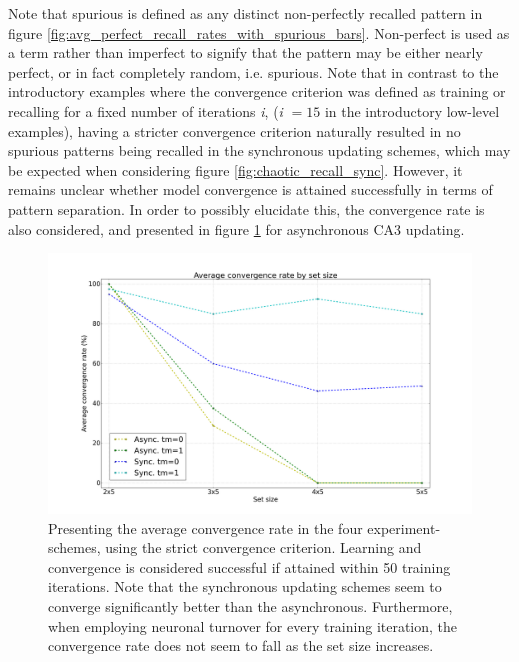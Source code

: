 Note that spurious is defined as any distinct non-perfectly recalled pattern in figure \ref{fig:avg_perfect_recall_rates_with_spurious_bars}. Non-perfect is used as a term rather than imperfect to signify that the pattern may be either nearly perfect, or in fact completely random, i.e. spurious. Note that in contrast to the introductory examples where the convergence criterion was defined as training or recalling for a fixed number of iterations \textit{i}, (\textit{i} $=15$ in the introductory low-level examples), having a stricter convergence criterion naturally resulted in no spurious patterns being recalled in the synchronous updating schemes, which may be expected when considering figure \ref{fig:chaotic_recall_sync}. However, it remains unclear whether model convergence is attained successfully in terms of pattern separation. In order to possibly elucidate this, the convergence rate is also considered, and presented in figure \ref{fig:convergence_rates_async_sync} for asynchronous CA3 updating.

\begin{figure}
    \centering
    \includegraphics[width=14cm]{fig/avg_convergence_rate}
    \caption{Presenting the average convergence rate in the four experiment-schemes, using the strict convergence criterion. Learning and convergence is considered successful if attained within 50 training iterations. Note that the synchronous updating schemes seem to converge significantly better than the asynchronous. Furthermore, when employing neuronal turnover for every training iteration, the convergence rate does not seem to fall as the set size increases.}
    \label{fig:convergence_rates_async_sync}
\end{figure}

